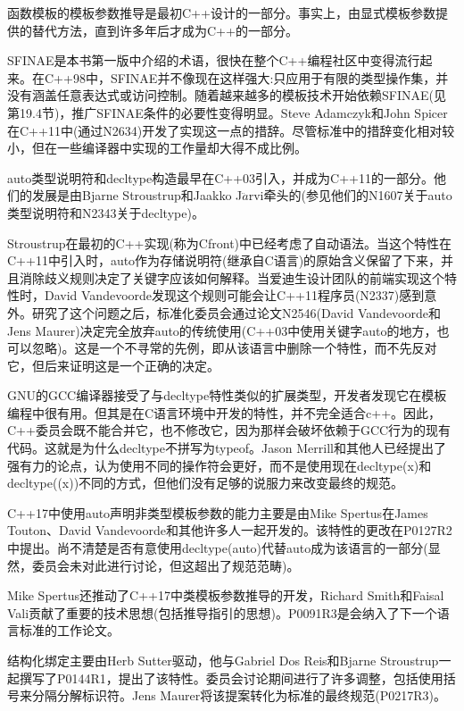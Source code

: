 函数模板的模板参数推导是最初C++设计的一部分。事实上，由显式模板参数提供的替代方法，直到许多年后才成为C++的一部分。

SFINAE是本书第一版中介绍的术语，很快在整个C++编程社区中变得流行起来。在C++98中，SFINAE并不像现在这样强大:只应用于有限的类型操作集，并没有涵盖任意表达式或访问控制。随着越来越多的模板技术开始依赖SFINAE(见第19.4节)，推广SFINAE条件的必要性变得明显。Steve Adamczyk和John Spicer在C++11中(通过N2634)开发了实现这一点的措辞。尽管标准中的措辞变化相对较小，但在一些编译器中实现的工作量却大得不成比例。

auto类型说明符和decltype构造最早在C++03引入，并成为C++11的一部分。他们的发展是由Bjarne Stroustrup和Jaakko J$\ddot{a}$rvi牵头的(参见他们的N1607关于auto类型说明符和N2343关于decltype)。

Stroustrup在最初的C++实现(称为Cfront)中已经考虑了自动语法。当这个特性在C++11中引入时，auto作为存储说明符(继承自C语言)的原始含义保留了下来，并且消除歧义规则决定了关键字应该如何解释。当爱迪生设计团队的前端实现这个特性时，David Vandevoorde发现这个规则可能会让C++11程序员(N2337)感到意外。研究了这个问题之后，标准化委员会通过论文N2546(David Vandevoorde和Jens Maurer)决定完全放弃auto的传统使用(C++03中使用关键字auto的地方，也可以忽略)。这是一个不寻常的先例，即从该语言中删除一个特性，而不先反对它，但后来证明这是一个正确的决定。

GNU的GCC编译器接受了与decltype特性类似的扩展类型，开发者发现它在模板编程中很有用。但其是在C语言环境中开发的特性，并不完全适合c++。因此，C++委员会既不能合并它，也不修改它，因为那样会破坏依赖于GCC行为的现有代码。这就是为什么decltype不拼写为typeof。Jason Merrill和其他人已经提出了强有力的论点，认为使用不同的操作符会更好，而不是使用现在decltype(x)和decltype((x))不同的方式，但他们没有足够的说服力来改变最终的规范。

C++17中使用auto声明非类型模板参数的能力主要是由Mike Spertus在James Touton、David Vandevoorde和其他许多人一起开发的。该特性的更改在P0127R2中提出。尚不清楚是否有意使用decltype(auto)代替auto成为该语言的一部分(显然，委员会未对此进行讨论，但这超出了规范范畴)。

Mike Spertus还推动了C++17中类模板参数推导的开发，Richard Smith和Faisal Vali贡献了重要的技术思想(包括推导指引的思想)。P0091R3是会纳入了下一个语言标准的工作论文。

结构化绑定主要由Herb Sutter驱动，他与Gabriel Dos Reis和Bjarne Stroustrup一起撰写了P0144R1，提出了该特性。委员会讨论期间进行了许多调整，包括使用括号来分隔分解标识符。Jens Maurer将该提案转化为标准的最终规范(P0217R3)。





